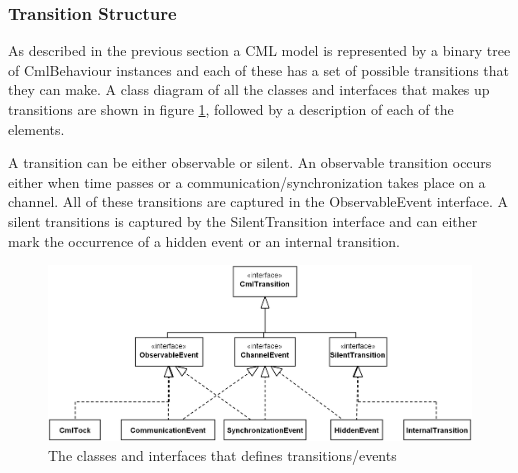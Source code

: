 \documentclass[a4paper, 12pt]{include/compassreport}   %
\begin{document}
\subsubsection{Transition Structure}
\label{sec:transition_structure}

As described in the previous section a CML model is represented by a
binary tree of CmlBehaviour instances and each of these has a set of
possible transitions that they can make. A class diagram of all the
classes and interfaces that makes up transitions are shown in figure
\ref{fig:events}, followed by a description of each of the elements.

A transition can be either observable or silent. An observable
transition occurs either when time passes or a
communication/synchronization takes place on a channel. All of these
transitions are captured in the ObservableEvent interface. 
A silent transitions is captured by the SilentTransition interface and
can either mark the occurrence of a hidden event or an internal
transition.

\begin{figure}[ht!]
  \begin{center}
    \includegraphics[width=1\textwidth]{figures/Events}
    \caption{The classes and interfaces that defines transitions/events}
    \label{fig:events}
  \end{center}
\end{figure}
\end{document}
